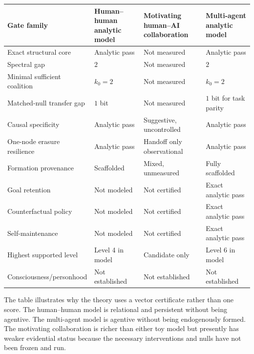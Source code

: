 \begin{center}
\small
\begin{tabularx}{\textwidth}{@{}>{\raggedright\arraybackslash}p{}>{\raggedright\arraybackslash}p{}>{\raggedright\arraybackslash}p{}>{\raggedright\arraybackslash}X@{}}
\toprule
Gate family & Human--human analytic model & Motivating human--AI collaboration & Multi-agent analytic model \\
\midrule
Exact structural core & Analytic pass & Not measured & Analytic pass \\
Spectral gap & \(2\) & Not measured & \(2\) \\
Minimal sufficient coalition & \(k_0=2\) & Not measured & \(k_0=2\) \\
Matched-null transfer gap & \(1\) bit & Not measured & \(1\) bit for task parity \\
Causal specificity & Analytic pass & Suggestive, uncontrolled & Analytic pass \\
One-node erasure resilience & Analytic pass & Handoff only observational & Analytic pass \\
Formation provenance & Scaffolded & Mixed, unmeasured & Fully scaffolded \\
Goal retention & Not modeled & Not certified & Exact analytic pass \\
Counterfactual policy & Not modeled & Not certified & Exact analytic pass \\
Self-maintenance & Not modeled & Not certified & Exact analytic pass \\
Highest supported level & Level 4 in model & Candidate only & Level 6 in model \\
Consciousness/\allowbreak personhood & Not established & Not established & Not established \\
\bottomrule
\end{tabularx}
\end{center}

The table illustrates why the theory uses a vector certificate rather than one
score. The human--human model is relational and persistent without being
agentive. The multi-agent model is agentive without being endogenously formed.
The motivating collaboration is richer than either toy model but presently has
weaker evidential status because the necessary interventions and nulls have not
been frozen and run.


